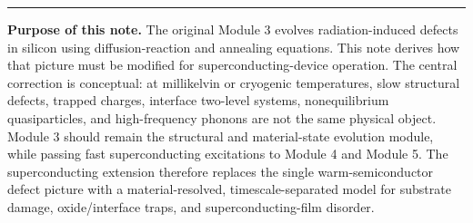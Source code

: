 \documentclass[11pt]{article}
\begin{document}

\hrule
\vspace{0.8em}

\begin{overviewbox}
\textbf{Purpose of this note.} The original Module 3 evolves radiation-induced defects in silicon using diffusion-reaction and annealing equations. This note derives how that picture must be modified for superconducting-device operation. The central correction is conceptual: at millikelvin or cryogenic temperatures, slow structural defects, trapped charges, interface two-level systems, nonequilibrium quasiparticles, and high-frequency phonons are not the same physical object. Module 3 should remain the structural and material-state evolution module, while passing fast superconducting excitations to Module 4 and Module 5. The superconducting extension therefore replaces the single warm-semiconductor defect picture with a material-resolved, timescale-separated model for substrate damage, oxide/interface traps, and superconducting-film disorder.
\end{overviewbox}

\ProjectTOC

\SymbolsAcronymsSection
\end{document}
